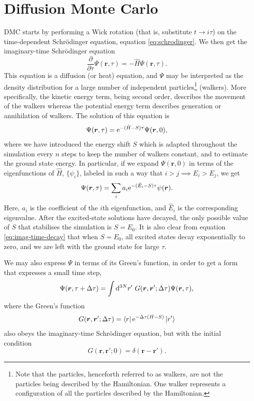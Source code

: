 \section{Diffusion Monte Carlo}
\Gls{DMC} starts by performing a Wick rotation (that is, substitute $t\to i\tau$) on the time-dependent Schr\"odinger equation, equation \ref{eq:schrodinger}. We then get the imaginary-time Schr\"odinger equation
\begin{equation}
    \label{eq:imag_time_schrodinger}
    \frac{\partial}{\partial\tau}\Psi(\bm r, \tau) = -\hat H \Psi(\bm r, \tau).
\end{equation}
This equation is a diffusion (or heat) equation, and $\Psi$ may be interpreted as the density distribution for a large number of independent particles\footnote{Note that the particles, henceforth referred to as walkers, are not the particles being described by the Hamiltonian. One walker represents a configuration of all the particles described by the Hamiltonian.} (walkers).\supercite{fickLiquid1995}
More specifically, the kinetic energy term, being second order, describes the movement of the walkers whereas the potential energy term describes generation or annihilation of walkers. The solution of this equation is
\begin{equation}
    \Psi(\bm r, \tau) = \mathrm{e}^{-(\hat H-S)\tau}\Psi(\bm r, 0),
\end{equation}
where we have introduced the energy shift $S$ which is adapted throughout the simulation every $n$ steps to keep the number of walkers constant, and to estimate the ground state energy.\supercite{kosztinIntroduction1996} In particular, if we expand $\Psi(\bm r, 0)$ in terms of the eigenfunctions of $\hat H$, $\{\psi_i\}$, labeled in such a way that $i>j\implies E_i>E_j$, we get
\begin{equation}
    \label{eq:imag-time-decay}
    \Psi(\bm r, \tau) = \sum_{i}a_i\mathrm{e}^{-(\hat E_i-S)\tau}\psi(\bm r).
\end{equation}
Here, $a_i$ is the coefficient of the $i$th eigenfunction, and $\hat E_i$ is the corresponding eigenvalue. After the excited-state solutions have decayed, the only possible value of $S$ that stabilises the simulation is $S=E_0$. It is also clear from equation \ref{eq:imag-time-decay} that when $S=E_0$, all excited states decay exponentially to zero, and we are left with the ground state for large $\tau$.

We may also express $\Psi$ in terms of its Green's function, in order to get a form that expresses a small time step,
\begin{equation}
\Psi(\bm r, \tau+\Delta\tau) = \int\mathrm{d}^{3N}r' \ G(\bm r, \bm r'; \Delta\tau)\Psi(\bm r, \tau),
\end{equation}
where the Green's function
\begin{equation}
G(\bm r, \bm r'; \Delta\tau) = \bra{r}\mathrm{e}^{-\Delta\tau(H-S)}\ket{r'}
\end{equation}
also obeys the imaginary-time Schr\"odinger equation, but with the initial condition
\begin{equation}
    G(\bm r, \bm r'; 0) = \delta(\bm r-\bm r').
\end{equation}

